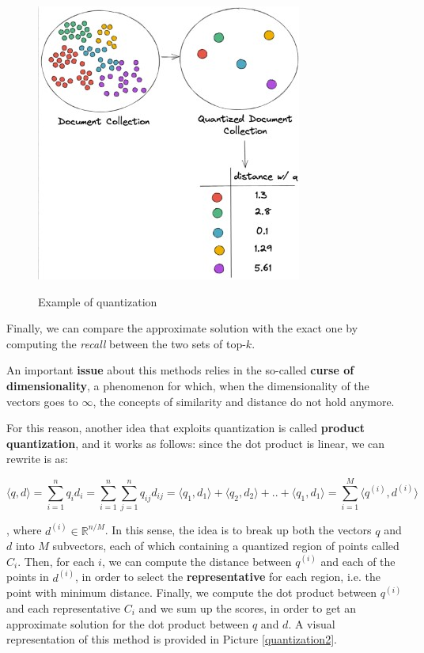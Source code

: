 \begin{figure}[h!]
		\centering
		\includegraphics[scale = 1.8]{img/quantization.jpg}
        \label{quantization}
        \caption{Example of quantization}
\end{figure}

Finally, we can compare the approximate solution with the exact one by computing the \textit{recall} between the two sets of top-$k$.

An important \textbf{issue} about this methods relies in the so-called \textbf{curse of dimensionality}, a phenomenon for which, when the dimensionality of the vectors goes to $\infty$, the concepts of similarity and distance do not hold anymore.

For this reason, another idea that exploits quantization is called \textbf{product quantization}, and it works as follows: since the dot product is linear, we can rewrite is as:

$$
\langle q,d \rangle = \sum_{i = 1}^n q_i d_i = \sum_{i = 1}^n \sum_{j = 1}^n q_{ij} d_{ij} = \langle q_1, d_1 \rangle + \langle q_2, d_2 \rangle + .. + \langle q_1, d_1 \rangle = \sum_{i = 1}^M \langle q^{(i)},d^{(i)} \rangle
$$

, where $d^{(i)} \in \mathbb{R}^{n/M}$. In this sense, the idea is to break up both the vectors $q$ and $d$ into $M$ subvectors, each of which containing a quantized region of points called $C_i$. Then, for each $i$, we can compute the distance between $q^{(i)}$ and each of the points in $d^{(i)}$, in order to select the \textbf{representative} for each region, i.e. the point with minimum distance. Finally, we compute the dot product between $q^{(i)}$ and each representative $C_i$ and we sum up the scores, in order to get an approximate solution for the dot product between $q$ and $d$. A visual representation of this method is provided in Picture \ref{quantization2}. 


